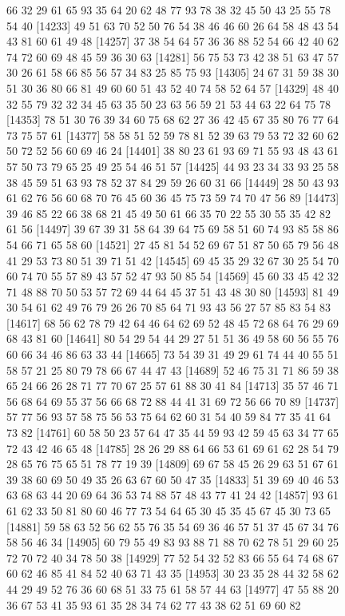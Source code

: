 \documentclass{article}
\begin{document}
\begin{figure}[H]
\begin{Schunk}
\begin{Soutput}
[14209] 66 32 29 61 65 93 35 64 20 62 48 77 93 78 38 32 45 50 43 25 55 78 54 40
[14233] 49 51 63 70 52 50 76 54 38 46 46 60 26 64 58 48 43 54 43 81 60 61 49 48
[14257] 37 38 54 64 57 36 36 88 52 54 66 42 40 62 74 72 60 69 48 45 59 36 30 63
[14281] 56 75 53 73 42 38 51 63 47 57 30 26 61 58 66 85 56 57 34 83 25 85 75 93
[14305] 24 67 31 59 38 30 51 30 36 80 66 81 49 60 60 51 43 52 40 74 58 52 64 57
[14329] 48 40 32 55 79 32 32 34 45 63 35 50 23 63 56 59 21 53 44 63 22 64 75 78
[14353] 78 51 30 76 39 34 60 75 68 62 27 36 42 45 67 35 80 76 77 64 73 75 57 61
[14377] 58 58 51 52 59 78 81 52 39 63 79 53 72 32 60 62 50 72 52 56 60 69 46 24
[14401] 38 80 23 61 93 69 71 55 93 48 43 61 57 50 73 79 65 25 49 25 54 46 51 57
[14425] 44 93 23 34 33 93 25 58 38 45 59 51 63 93 78 52 37 84 29 59 26 60 31 66
[14449] 28 50 43 93 61 62 76 56 60 68 70 76 45 60 36 45 75 73 59 74 70 47 56 89
[14473] 39 46 85 22 66 38 68 21 45 49 50 61 66 35 70 22 55 30 55 35 42 82 61 56
[14497] 39 67 39 31 58 64 39 64 75 69 58 51 60 74 93 85 58 86 54 66 71 65 58 60
[14521] 27 45 81 54 52 69 67 51 87 50 65 79 56 48 41 29 53 73 80 51 39 71 51 42
[14545] 69 45 35 29 32 67 30 25 54 70 60 74 70 55 57 89 43 57 52 47 93 50 85 54
[14569] 45 60 33 45 42 32 71 48 88 70 50 53 57 72 69 44 64 45 37 51 43 48 30 80
[14593] 81 49 30 54 61 62 49 76 79 26 26 70 85 64 71 93 43 56 27 57 85 83 54 83
[14617] 68 56 62 78 79 42 64 46 64 62 69 52 48 45 72 68 64 76 29 69 68 43 81 60
[14641] 80 54 29 54 44 29 27 51 51 36 49 58 60 56 55 76 60 66 34 46 86 63 33 44
[14665] 73 54 39 31 49 29 61 74 44 40 55 51 58 57 21 25 80 79 78 66 67 44 47 43
[14689] 52 46 75 31 71 86 59 38 65 24 66 26 28 71 77 70 67 25 57 61 88 30 41 84
[14713] 35 57 46 71 56 68 64 69 55 37 56 66 68 72 88 44 41 31 69 72 56 66 70 89
[14737] 57 77 56 93 57 58 75 56 53 75 64 62 60 31 54 40 59 84 77 35 41 64 73 82
[14761] 60 58 50 23 57 64 47 35 44 59 93 42 59 45 63 34 77 65 72 43 42 46 65 48
[14785] 28 26 29 88 64 66 53 61 69 61 62 28 54 79 28 65 76 75 65 51 78 77 19 39
[14809] 69 67 58 45 26 29 63 51 67 61 39 38 60 69 50 49 35 26 63 67 60 50 47 35
[14833] 51 39 69 40 46 53 63 68 63 44 20 69 64 36 53 74 88 57 48 43 77 41 24 42
[14857] 93 61 61 62 33 50 81 80 60 46 77 73 54 64 65 30 45 35 45 67 45 30 73 65
[14881] 59 58 63 52 56 62 55 76 35 54 69 36 46 57 51 37 45 67 34 76 58 56 46 34
[14905] 60 79 55 49 83 93 88 71 88 70 62 78 51 29 60 25 72 70 72 40 34 78 50 38
[14929] 77 52 54 32 52 83 66 55 64 74 68 67 60 62 46 85 41 84 52 40 63 71 43 35
[14953] 30 23 35 28 44 32 58 62 44 29 49 52 76 36 60 68 51 33 75 61 58 57 44 63
[14977] 47 55 88 20 36 67 53 41 35 93 61 35 28 34 74 62 77 43 38 62 51 69 60 82

\end{Soutput}
\end{Schunk}
\end{figure}
\end{document}
